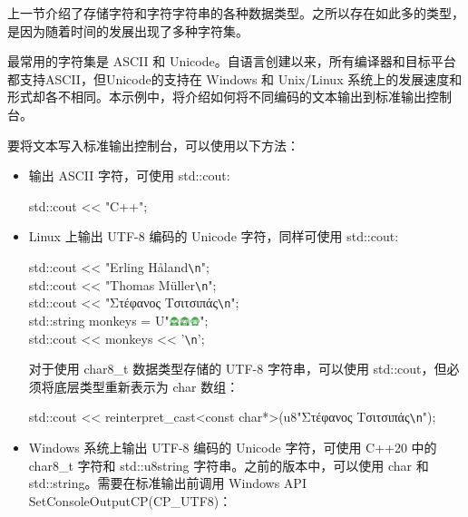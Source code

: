 
上一节介绍了存储字符和字符字符串的各种数据类型。之所以存在如此多的类型，是因为随着时间的发展出现了多种字符集。

最常用的字符集是 ASCII 和 Unicode。自语言创建以来，所有编译器和目标平台都支持ASCII，但Unicode的支持在 Windows 和 Unix/Linux 系统上的发展速度和形式却各不相同。本示例中，将介绍如何将不同编码的文本输出到标准输出控制台。


要将文本写入标准输出控制台，可以使用以下方法：

\begin{itemize}
\item
输出 ASCII 字符，可使用 std::cout:

\begin{cpp}
std::cout << "C++\n";
\end{cpp}

\item
Linux 上输出 UTF-8 编码的 Unicode 字符，同样可使用 std::cout:

\begin{tcolorbox}[ breakable,colback = blue!5!white, colframe=black!7!white]
\scriptsize{
std::cout <{}< "Erling Håland\verb|\n|"; \\
std::cout <{}< "Thomas Müller\verb|\n|"; \\
std::cout <{}< "Στέφανος Τσιτσιπάς\verb|\n|"; \\
std::string monkeys  = U"\includegraphics[width=0.07\textwidth]{content/chapter2/images/code-2.png}";\\
std::cout <{}< monkeys <{}< '\verb|\n|';
}
\end{tcolorbox}

对于使用 char8\_t 数据类型存储的 UTF-8 字符串，可以使用 std::cout，但必须将底层类型重新表示为 char 数组：

\begin{tcolorbox}[ breakable,colback = blue!5!white, colframe=black!7!white]
\scriptsize{
std::cout <{}< reinterpret\_cast<const char*>(u8"Στέφανος Τσιτσιπάς\verb|\n|");
}
\end{tcolorbox}

\item
Windows 系统上输出 UTF-8 编码的 Unicode 字符，可使用 C++20 中的 char8\_t 字符和 std::u8string 字符串。之前的版本中，可以使用 char 和 std::string。需要在标准输出前调用 Windows API SetConsoleOutputCP(CP\_UTF8)：


\end{itemize}

